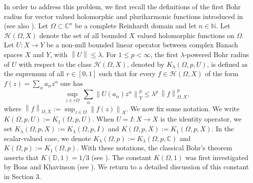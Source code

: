 \documentclass[a4paper,11pt, reqno]{amsart}
\theoremstyle{definition}
\newcommand{\norm}[1]{\left\lVert#1\right\rVert}
\begin{document}
	In order to address this problem, we first recall the definitions of the first Bohr radius for vector valued holomorphic and pluriharmonic functions introduced in \cite{Himadri-local-Banach-1} (see also \cite{defant-2011}). Let $\Omega \subset \mathbb{C}^n$ be a complete Reinhardt domain and let $n \in \mathbb{N}$. Let $\mathcal{H}(\Omega,X)$ denote the set of all bounded $X$ valued holomorphic functions on $\Omega$. Let $U:X\rightarrow Y$ be a non-null bounded linear operator between complex Banach spaces $X$ and $Y$, with $\norm{U} \leq \lambda$. For $1 \leq p < \infty$, the first $\lambda$-powered Bohr radius of $U$ with respect to the class $\mathcal{H}(\Omega,X)$, denoted by $K_{\lambda}(\Omega, p,U)$, is defined as the supremum of all $r \in [0,1]$ such that for every $f \in \mathcal{H}(\Omega,X)$ of the form $f(z)=\sum_{\alpha}a_{\alpha}z^{\alpha}$ one has 
	\begin{equation} \label{e-1.2} \sup_{z \in r\Omega}\, \sum_{\alpha} \norm{U(a_{\alpha})z^\alpha}^p_{Y} \leq \lambda^p\,\norm{f}^p_{\Omega,X}, \end{equation} 
	where $\norm{f}_{\Omega,X}:=\sup_{z \in \Omega}\norm{f(z)}_{X}$. We now fix some notation. We write $K(\Omega, p,U):=K_{1}(\Omega, p,U)$. When $U=I:X\rightarrow X$ is the identity operator, we set $K_{\lambda}(\Omega, p,X):=K_{\lambda}(\Omega, p,I)$ and $K(\Omega, p,X):=K_{1}(\Omega, p,X)$. In the scalar-valued case, we denote $K_{\lambda}(\Omega, p):=K_{\lambda}(\Omega, p,\mathbb{C})$ and $K(\Omega,p):=K_1(\Omega,p)$. With these notations, the classical Bohr's theorem asserts that $K(\mathbb{D},1)=1/3$ (see \cite{Bohr-1914}). The constant $K(\Omega,1)$ was first investigated by Boas and Khavinson (see \cite{boas-1997,boas-2000}). We return to a detailed discussion of this constant in Section $3$.
	\vspace{1mm}
	
\end{document}
